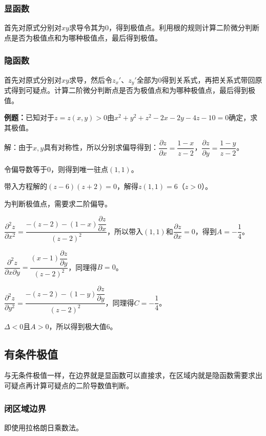 \documentclass[UTF8, 12pt]{ctexart}
\begin{document}
\subsubsection{显函数}

首先对原式分别对$xy$求导令其为0，得到极值点。利用根的规则计算二阶微分判断点是否为极值点和为哪种极值点，最后得到极值。

\subsubsection{隐函数}

首先对原式分别对$xy$求导，然后令$z_x'$、$z_y'$全部为0得到关系式，再把关系式带回原式得到可疑点。计算二阶微分判断点是否为极值点和为哪种极值点，最后得到极值。

\textbf{例题：}已知对于$z=z(x,y)>0$由$x^2+y^2+z^2-2x-2y-4z-10=0$确定，求其极值。

解：由于$x,y$具有对称性，所以分别求偏导得到：$\dfrac{\partial z}{\partial x}=\dfrac{1-x}{z-2}$，$\dfrac{\partial z}{\partial y}=\dfrac{1-y}{z-2}$。

令偏导数等于0，则得到唯一驻点$(1,1)$。

带入方程解的$(z-6)(z+2)=0$，解得$z(1,1)=6$（$z>0$）。

为判断极值点，需要求二阶偏导。

$\dfrac{\partial^2z}{\partial x^2}=\dfrac{-(z-2)-(1-x)\dfrac{\partial z}{\partial x}}{(z-2)^2}$，所以带入$(1,1)$和$\dfrac{\partial z}{\partial x}=0$，得到$A=-\dfrac{1}{4}$。

$\dfrac{\partial^2z}{\partial x\partial y}=\dfrac{(x-1)\dfrac{\partial z}{\partial y}}{(z-2)^2}$，同理得$B=0$。

$\dfrac{\partial^2z}{\partial y^2}=\dfrac{-(z-2)-(1-y)\dfrac{\partial z}{\partial y}}{(z-2)^2}$，同理得$C=-\dfrac{1}{4}$。

$\Delta<0$且$A>0$，所以得到极大值6。

\subsection{有条件极值}

与无条件极值一样，在边界就是显函数可以直接求，在区域内就是隐函数需要求出可疑点再计算可疑点的二阶导数值判断。

\subsubsection{闭区域边界}

即使用拉格朗日乘数法。
\end{document}
